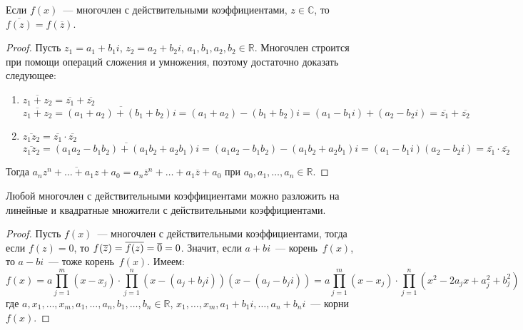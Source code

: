 \begin{lemma}
Если $f(x)$~--- многочлен с действительными коэффициентами, $z \in \mathbb C$, то $\overline{f(z)} = f(\overline z)$.
\end{lemma}
\begin{proof}
Пусть $z_1 = a_1 + b_1 i$, $z_2 = a_2 + b_2 i$, $a_1, b_1, a_2, b_2 \in \mathbb R$.
Многочлен строится при помощи операций сложения и умножения, поэтому достаточно доказать следующее:
\begin{enumerate}
	\item $\overline{z_1 + z_2} = \overline{z_1} + \overline{z_2}$
	\begin{equation*}
	\overline{z_1 + z_2} = \overline{(a_1 + a_2) + (b_1 + b_2)i} = (a_1 + a_2) - (b_1 + b_2)i =
	(a_1 - b_1 i) + (a_2 - b_2 i) = \overline{z_1} + \overline{z_2}
	\end{equation*}
	
	\item $\overline{z_1 z_2} = \overline{z_1} \cdot \overline{z_2}$
	\begin{equation*}
	\overline{z_1 z_2} = \overline{(a_1 a_2 - b_1 b_2) + (a_1 b_2 + a_2 b_1)i} =
	(a_1 a_2 - b_1 b_2) - (a_1 b_2 + a_2 b_1)i = (a_1 - b_1 i)(a_2 - b_2 i) =
	\overline{z_1} \cdot \overline{z_2}
	\end{equation*}
\end{enumerate}
Тогда $\overline{a_n z^n + \ldots + a_1 z + a_0} = a_n \overline z^n + \ldots + a_1 \overline z + a_0$ при $a_0, a_1, \ldots, a_n \in \mathbb R$.
\end{proof}

\begin{theorem}
\label{th:polynomial_factorization}
Любой многочлен с действительными коэффициентами можно разложить на линейные и квадратные множители с действительными коэффициентами.
\end{theorem}
\begin{proof}
Пусть $f(x)$~--- многочлен с действительными коэффициентами, тогда если $f(z) = 0$, то $f(\overline z) \opbr= \overline{f(z)} \opbr= \overline 0 \opbr= 0$.
Значит, если $a + bi$~--- корень~$f(x)$, то $a - bi$~--- тоже корень~$f(x)$.
Имеем:
\begin{equation*}
f(x) = a \prod_{j=1}^{m} (x - x_j) \cdot \prod_{j=1}^{n} (x - (a_j + b_j i))(x - (a_j - b_j i)) =
a \prod_{j=1}^{m} (x - x_j) \cdot \prod_{j=1}^{n} (x^2 - 2a_j x + a_j^2 + b_j^2)
\end{equation*}
где $a, x_1, \ldots, x_m, a_1, \ldots, a_n, b_1, \ldots, b_n \in \mathbb R$,
$x_1, \ldots, x_m, a_1 + b_1 i, \ldots, a_n + b_n i$~--- корни~$f(x)$.
\end{proof}


